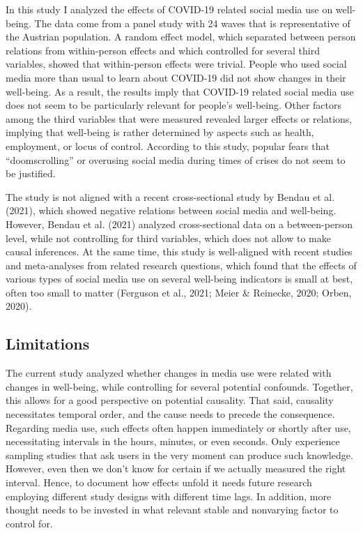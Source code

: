 \documentclass[
  english,
  man,mask,floatsintext]{apa6}
\begin{document}
In this study I analyzed the effects of COVID-19 related social media use on well-being.
The data come from a panel study with 24 waves that is representative of the Austrian population.
A random effect model, which separated between person relations from within-person effects and which controlled for several third variables, showed that within-person effects were trivial.
People who used social media more than usual to learn about COVID-19 did not show changes in their well-being.
As a result, the results imply that COVID-19 related social media use does not seem to be particularly relevant for people's well-being.
Other factors among the third variables that were measured revealed larger effects or relations, implying that well-being is rather determined by aspects such as health, employment, or locus of control.
According to this study, popular fears that ``doomscrolling'' or overusing social media during times of crises do not seem to be justified.

The study is not aligned with a recent cross-sectional study by Bendau et al. (2021), which showed negative relations between social media and well-being.
However, Bendau et al. (2021) analyzed cross-sectional data on a between-person level, while not controlling for third variables, which does not allow to make causal inferences.
At the same time, this study is well-aligned with recent studies and meta-analyses from related research questions, which found that the effects of various types of social media use on several well-being indicators is small at best, often too small to matter (Ferguson et al., 2021; Meier \& Reinecke, 2020; Orben, 2020).

\hypertarget{limitations}{%
\subsection{Limitations}\label{limitations}}

The current study analyzed whether changes in media use were related with changes in well-being, while controlling for several potential confounds.
Together, this allows for a good perspective on potential causality.
That said, causality necessitates temporal order, and the cause needs to precede the consequence.
Regarding media use, such effects often happen immediately or shortly after use, necessitating intervals in the hours, minutes, or even seconds.
Only experience sampling studies that ask users in the very moment can produce such knowledge.
However, even then we don't know for certain if we actually measured the right interval.
Hence, to document how effects unfold it needs future research employing different study designs with different time lags.
In addition, more thought needs to be invested in what relevant stable and nonvarying factor to control for.
\end{document}
